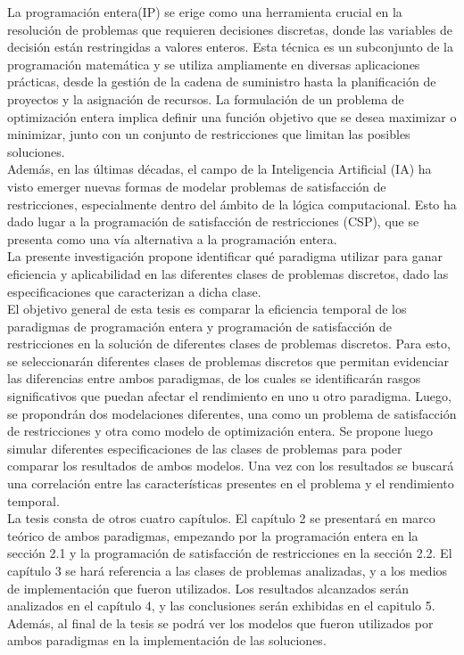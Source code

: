 \documentclass[12pt]{report}
\begin{document}
La programación entera(IP) se erige como una herramienta crucial en la resolución de problemas que requieren decisiones discretas, donde las variables de decisión están restringidas a valores enteros. Esta técnica es un subconjunto de la programación matemática y se utiliza ampliamente en diversas aplicaciones prácticas, desde la gestión de la cadena de suministro hasta la planificación de proyectos y la asignación de recursos. La formulación de un problema de optimización entera implica definir una función objetivo que se desea maximizar o minimizar, junto con un conjunto de restricciones que limitan las posibles soluciones.  \\

Además, en las últimas décadas, el campo de la Inteligencia Artificial (IA) ha visto emerger nuevas formas de modelar problemas de satisfacción de restricciones, especialmente dentro del ámbito de la lógica computacional. Esto ha dado lugar a la programación de satisfacción de restricciones (CSP), que se presenta como una vía alternativa a la programación entera.  \\

La presente investigación propone identificar qué paradigma utilizar para ganar eficiencia y aplicabilidad en las diferentes clases de problemas discretos, dado las especificaciones que caracterizan a dicha clase.  \\

El objetivo general de esta tesis es comparar la eficiencia temporal de los paradigmas de programación entera y programación de satisfacción de restricciones en la solución de diferentes clases de problemas discretos. Para esto, se seleccionarán diferentes clases de problemas discretos que permitan evidenciar las diferencias entre ambos paradigmas, de los cuales se identificarán rasgos significativos que puedan afectar el rendimiento en uno u otro paradigma. Luego, se propondrán dos modelaciones diferentes, una como un problema de satisfacción de restricciones y otra como modelo de optimización entera. Se propone luego simular diferentes especificaciones de las clases de problemas para poder comparar los resultados de ambos modelos. Una vez con los resultados se buscará una correlación entre las características presentes en el problema y el rendimiento temporal.\\

La tesis consta de otros cuatro capítulos. El capítulo 2 se presentará en marco teórico de ambos paradigmas, empezando por la programación entera en la sección 2.1 y la programación de satisfacción de restricciones en la sección 2.2. El capítulo 3 se hará referencia a las clases de problemas analizadas, y a los medios de implementación que fueron utilizados. Los resultados alcanzados serán analizados en el capítulo 4, y las conclusiones serán exhibidas en el capitulo 5. Además, al final de la tesis se podrá ver los modelos que fueron utilizados por ambos paradigmas en la implementación de las soluciones.\\
\end{document}
